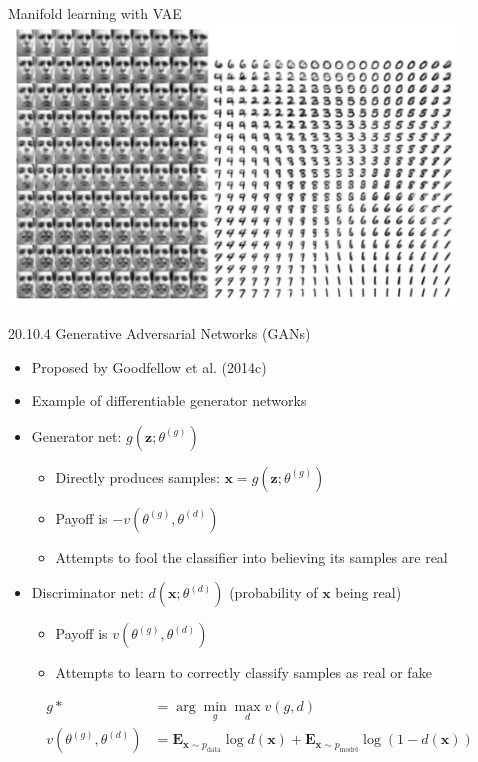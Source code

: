 \documentclass[dvipdfmx,presentation]{beamer}
\def\bf{\mathbf}
\begin{document}
\begin{frame}[label={sec:orgheadline27}]{Manifold learning with VAE}
\centering
\includegraphics[width=0.90\textwidth]{./figure/dlbook_fig20_6.png}
\end{frame}

\begin{frame}[label={sec:orgheadline28}]{20.10.4 Generative Adversarial Networks (GANs)}
\begin{itemize}
\item Proposed by Goodfellow et al. (2014c)
\item Example of differentiable generator networks
\item Generator net: \(g(\bf{z}; \theta^{(g)})\)
\begin{itemize}
\item Directly produces samples: \(\bf{x} = g(\bf{z}; \theta^{(g)})\)
\item Payoff is \(- v(\theta^{(g)}, \theta^{(d)})\)
\item Attempts to fool the classifier into believing its samples are real
\end{itemize}
\item Discriminator net: \(d(\bf{x}; \theta^{(d)})\) (probability of \(\bf{x}\) being real)
\begin{itemize}
\item Payoff is \(v(\theta^{(g)}, \theta^{(d)})\)
\item Attempts to learn to correctly classify samples as real or fake
\end{itemize}
\end{itemize}
\begin{align*}
g* &= \arg \min_{g} \max_{d} v(g, d) \\
v(\theta^{(g)}, \theta^{(d)}) &= \bf{E}_{\bf{x} \sim p_{\mathrm{data}}} \log d(\bf{x})
+ \bf{E}_{\bf{x} \sim p_{\mathrm{model}}} \log (1 - d(\bf{x}))
\end{align*}
\end{frame}
\end{document}
